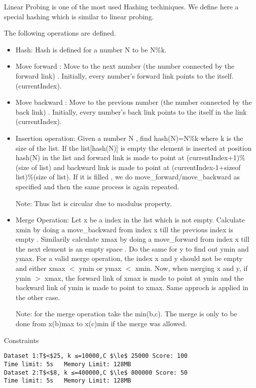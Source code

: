 Linear Probing is one of the most used Hashing techiniques. We define here a special hashing which is similar to linear probing.  

   The following operations are defined.  
\begin{itemize}
	\item     Hash: Hash is defined for a number N to be N\%k.   
	\item     Move forward : Move to the next number (the number connected by the forward link) . Initially, every number's forward link points to the itself. (currentIndex).   
	\item     Move backward : Move to the previous number (the number connected by the back link) . Initially, every number's back link points to the itself in the link (currentIndex).   
	\item     Insertion operation: Given a number N , find hash(N)=N\%k where k is the size of the list. If the list[hash(N)] is empty the element is inserted at position hash(N) in the list and forward link is made to point at (currentIndex+1)\%(size of list) and backward link is made to point at (currentIndex-1+sizeof list)\%(size of list). If it is filled , we do move\_forward/move\_backward as specified and then the same process is again repeated.   

    Note: Thus list is circular due to modulus property.   
	\item     Merge Operation: Let x be a index in the list which is not empty. Calculate xmin by doing a move\_backward from index x till the previous index is empty . Similarily calculate xmax by doing a move\_forward from index x till the next element is an empty space . Do the same for y to find out ymin and ymax. For a valid merge operation, the index x and y should not be empty and either xmax $<$ ymin or ymax $<$ xmin. Now, when merging x and y, if ymin $>$ xmax, the forward link of xmax is made to point at ymin and the backward link of ymin is made to point to xmax. Same approch is applied in the other case.   

    Note: for the merge operation take the min(b,c). The merge is only to be done from x(b)max to x(c)min if the merge was allowed.   
\end{itemize}

Constraints
\begin{verbatim}
Dataset 1:T$<$25, k ≤=10000,C $\le$ 25000 Score: 100
Time limit: 5s   Memory Limit: 128MB
Dataset 2:T$<$8, k ≤=400000,C $\le$ 800000 Score: 50
Time limit: 5s   Memory Limit: 128MB 
\end{verbatim}